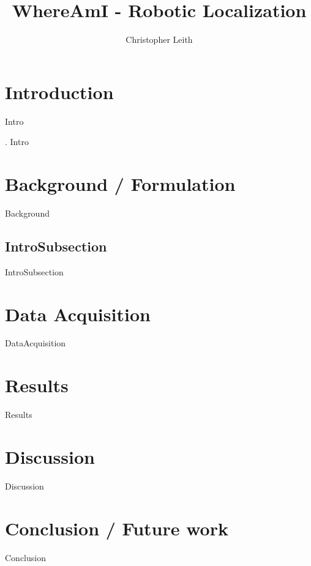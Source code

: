 \documentclass[10pt,journal,compsoc]{IEEEtran}
\begin{document}
\title{WhereAmI - Robotic Localization}

\author{Christopher Leith}

%
{}


\maketitle
\IEEEdisplaynontitleabstractindextext
\IEEEpeerreviewmaketitle
\section{Introduction}
Intro
\label{sec:introduction}

. 
Intro

\section{Background / Formulation}
Background

\subsection{IntroSubsection}
IntroSubsection


\section{Data Acquisition}
DataAcquisition

\section{Results}
Results

\section{Discussion}
Discussion

\section{Conclusion / Future work}
Conclusion
\end{document}
